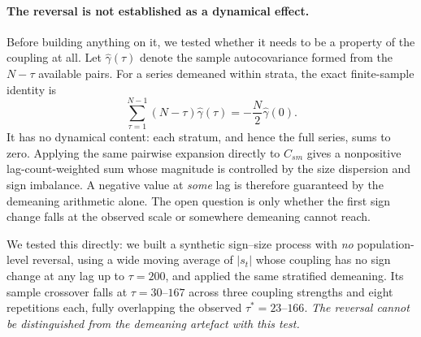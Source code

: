 \documentclass[aps,pre,twocolumn,superscriptaddress,floatfix,nofootinbib]{revtex4-2}
\begin{document}
\paragraph*{The reversal is not established as a dynamical effect.}
Before building anything on it, we tested whether it needs to be a property of
the coupling at all. Let $\hat\gamma(\tau)$ denote the sample autocovariance
formed from the $N-\tau$ available pairs. For a series demeaned within strata,
the exact finite-sample identity is
\begin{equation}
  \sum_{\tau=1}^{N-1}(N-\tau)\hat\gamma(\tau)
  =-\frac{N}{2}\hat\gamma(0) .
  \label{eq:demeanarea}
\end{equation}
It has no dynamical content: each stratum, and hence the full series, sums to
zero. Applying the same pairwise expansion directly to $C_{sm}$ gives a
nonpositive lag-count-weighted sum whose magnitude is controlled by the size
dispersion and sign imbalance. A negative value at \emph{some} lag is therefore
guaranteed by the demeaning arithmetic alone. The open question is only whether
the first sign change falls at the observed scale or somewhere demeaning cannot
reach.

We tested this directly: we built a synthetic sign--size process with \emph{no}
population-level reversal, using a wide moving average of $|s_t|$ whose
coupling has no sign change at any lag up to $\tau=200$, and applied the same
stratified demeaning. Its sample crossover falls at
$\tau=30$--$167$ across three coupling strengths and eight repetitions each,
fully overlapping the observed $\tau^{*}=23$--$166$. \emph{The reversal cannot
be distinguished from the demeaning artefact with this test.}
\end{document}

